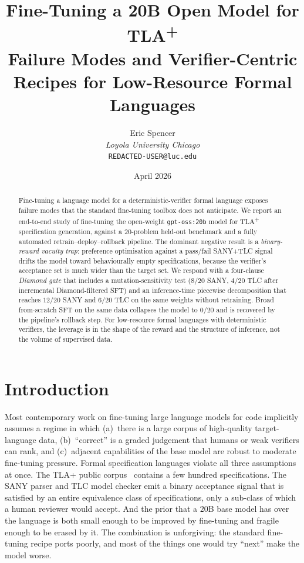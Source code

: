 \documentclass[11pt]{article}
\title{Fine-Tuning a 20B Open Model for TLA\textsuperscript{+}\\
\large Failure Modes and Verifier-Centric Recipes for Low-Resource Formal Languages}
\author{Eric Spencer\\
\small \textit{Loyola University Chicago}\\
\small \texttt{REDACTED-USER@luc.edu}}
\date{April 2026}
\begin{document}
\maketitle

\begin{abstract}
Fine-tuning a language model for a deterministic-verifier formal language
exposes failure modes that the standard fine-tuning toolbox does not
anticipate. We report an end-to-end study of fine-tuning the open-weight
\texttt{gpt-oss:20b} model for TLA\textsuperscript{+} specification
generation, against a $20$-problem held-out benchmark and a fully
automated retrain--deploy--rollback pipeline. The dominant negative
result is a \emph{binary-reward vacuity trap}: preference optimisation
against a pass/fail SANY+TLC signal drifts the model toward
behaviourally empty specifications, because the verifier's acceptance
set is much wider than the target set. We respond with a four-clause
\emph{Diamond gate} that includes a mutation-sensitivity test
($8/20$ SANY, $4/20$ TLC after incremental Diamond-filtered SFT) and an
inference-time piecewise decomposition that reaches $12/20$ SANY and
$6/20$ TLC on the same weights without retraining. Broad from-scratch
SFT on the same data collapses the model to $0/20$ and is recovered by
the pipeline's rollback step. For low-resource formal languages with
deterministic verifiers, the leverage is in the shape of the reward and
the structure of inference, not the volume of supervised data.
\end{abstract}

\section{Introduction}
\label{sec:intro}

Most contemporary work on fine-tuning large language models for code
implicitly assumes a regime in which (a)~there is a large corpus of
high-quality target-language data, (b)~``correct'' is a graded judgement
that humans or weak verifiers can rank, and (c)~adjacent capabilities of
the base model are robust to moderate fine-tuning pressure. Formal
specification languages violate all three assumptions at once. The TLA+
public corpus~\cite{lamport2002specifying} contains a few hundred
specifications. The SANY parser and TLC model checker emit a binary
acceptance signal that is satisfied by an entire equivalence class of
specifications, only a sub-class of which a human reviewer would accept.
And the prior that a $20$B base model has over the language is both small
enough to be improved by fine-tuning and fragile enough to be erased by
it. The combination is unforgiving: the standard fine-tuning recipe ports
poorly, and most of the things one would try ``next'' make the model
worse.
\end{document}
